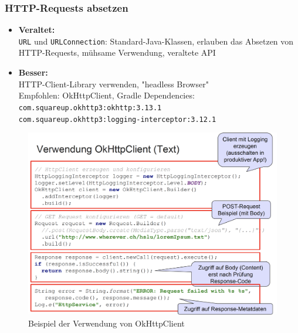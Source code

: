 \documentclass[a4paper]{article}
\begin{document}
		\subsubsection{HTTP-Requests absetzen}
		
		\begin{itemize}
			\item \textbf{Veraltet:}\\
					\texttt{URL} und \texttt{URLConnection}: Standard-Java-Klassen, erlauben das Absetzen von HTTP-Requests, mühsame Verwendung, veraltete API
			
			\item \textbf{Besser:}\\
					HTTP-Client-Library verwenden, "headless Browser"\\
					Empfohlen: OkHttpClient, Gradle Dependencies: \\
					\texttt{com.squareup.okhttp3:okhttp:3.13.1}\\
					\texttt{com.squareup.okhttp3:logging-interceptor:3.12.1}
		\end{itemize}
	
		\begin{figure}[!htb]
			\centering
			\includegraphics[width=\textwidth]{img/okhttp_verwendung.png}
			\caption{Beispiel der Verwendung von OkHttpClient}
			\label{fig:okhttp_verwendung}
		\end{figure}
		
\end{document}

